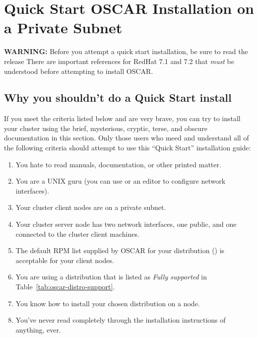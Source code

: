 %
%
%

\section{Quick Start OSCAR Installation on a Private Subnet}
\label{sec:quick-start}

\begchange

{\bf WARNING:} Before you attempt a quick start installation, be sure
to read the release   There are important references for RedHat 7.1 and 7.2
  that {\em must} be understood before attempting to install OSCAR.

\endchange


\subsection{Why you shouldn't do a Quick Start install}

If you meet the criteria listed below and are very brave, you can try
to install your cluster using the brief, mysterious, cryptic, terse,
and obscure documentation in this section.  Only those users who meed
and understand all of the following criteria should attempt to use
this ``Quick Start'' installation guide:

\begin{enumerate}
\item You hate to read manuals, documentation, or other printed
  matter.
\item You are a UNIX guru (you can use  or an editor to
  configure network interfaces).
\item Your cluster client nodes are on a private subnet.
\item Your cluster server node has two network interfaces, one
  public, and one connected to the cluster client machines.
\item The default RPM list supplied by OSCAR for your distribution
  ()
  is acceptable for your client nodes.
\item You are using a distribution that is listed as \emph{Fully
    supported} in Table~\ref{tab:oscar-distro-support}.
\item You know how to install your chosen distribution on a node.
\item You've never read completely through the installation
  instructions of anything, ever.
\end{enumerate}

